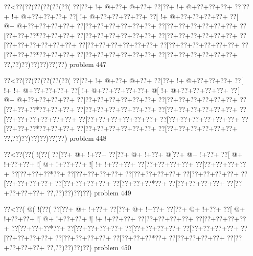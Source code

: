 \vbox{\vbox{\goo
\0??<\0??(\0??(\0??(\0??(\0??(\0??(
\0??[\0??+\- !+\- @+\0??+\- @+\0??+
\0??[\0??+\- !+\- @+\0??+\0??+\0??+
\0??[\0??+\- !+\- @+\0??+\0??+\0??+
\0??[\- !+\- @+\0??+\0??+\0??+\0??+
\0??[\- !+\- @+\0??+\0??+\0??+\0??+
\0??[\- @+\- @+\0??+\0??+\0??+\0??+
\0??[\0??+\0??+\0??+\0??+\0??+\0??+
\0??[\0??+\0??+\0??+\0??+\0??+\0??+
\0??[\0??+\0??+\0??*\0??+\0??+\0??+
\0??[\0??+\0??+\0??+\0??+\0??+\0??+
\0??[\0??+\0??+\0??+\0??+\0??+\0??+
\0??[\0??+\0??+\0??+\0??+\0??+\0??+
\0??[\0??+\0??+\0??+\0??+\0??+\0??+
\0??[\0??+\0??+\0??+\0??+\0??+\0??+
\0??[\0??+\0??+\0??*\0??+\0??+\0??+
\0??[\0??+\0??+\0??+\0??+\0??+\0??+
\0??[\0??+\0??+\0??+\0??+\0??+\0??+
\0??,\0??)\0??)\0??)\0??)\0??)\0??)
}
\hfil problem 447\hfil\break
}

\vbox{\vbox{\goo
\0??<\0??(\0??(\0??(\0??(\0??(\0??(
\0??[\0??+\- !+\- @+\0??+\- @+\0??+
\0??[\0??+\- !+\- @+\0??+\0??+\0??+
\0??[\- !+\- !+\- @+\0??+\0??+\0??+
\0??[\- !+\- @+\0??+\0??+\0??+\0??+
\- @[\- !+\- @+\0??+\0??+\0??+\0??+
\0??[\- @+\- @+\0??+\0??+\0??+\0??+
\0??[\0??+\0??+\0??+\0??+\0??+\0??+
\0??[\0??+\0??+\0??+\0??+\0??+\0??+
\0??[\0??+\0??+\0??*\0??+\0??+\0??+
\0??[\0??+\0??+\0??+\0??+\0??+\0??+
\0??[\0??+\0??+\0??+\0??+\0??+\0??+
\0??[\0??+\0??+\0??+\0??+\0??+\0??+
\0??[\0??+\0??+\0??+\0??+\0??+\0??+
\0??[\0??+\0??+\0??+\0??+\0??+\0??+
\0??[\0??+\0??+\0??*\0??+\0??+\0??+
\0??[\0??+\0??+\0??+\0??+\0??+\0??+
\0??[\0??+\0??+\0??+\0??+\0??+\0??+
\0??,\0??)\0??)\0??)\0??)\0??)\0??)
}
\hfil problem 448\hfil\break
}

\vbox{\vbox{\goo
\0??<\0??(\0??(\- !(\0??(
\0??[\0??+\- @+\- !+\0??+
\0??[\0??+\- @+\- !+\0??+
\- @[\0??+\- @+\- !+\0??+
\0??[\- @+\- !+\0??+\0??+
\- ![\- @+\- !+\0??+\0??+
\- ![\- !+\- !+\0??+\0??+
\0??[\0??+\0??+\0??+\0??+
\0??[\0??+\0??+\0??+\0??+
\0??[\0??+\0??+\0??*\0??+
\0??[\0??+\0??+\0??+\0??+
\0??[\0??+\0??+\0??+\0??+
\0??[\0??+\0??+\0??+\0??+
\0??[\0??+\0??+\0??+\0??+
\0??[\0??+\0??+\0??+\0??+
\0??[\0??+\0??+\0??*\0??+
\0??[\0??+\0??+\0??+\0??+
\0??[\0??+\0??+\0??+\0??+
\0??,\0??)\0??)\0??)\0??)
}
\hfil problem 449\hfil\break
}

\vbox{\vbox{\goo
\0??<\0??(\- @(\- !(\0??(
\0??[\0??+\- @+\- !+\0??+
\0??[\0??+\- @+\- !+\0??+
\0??[\0??+\- @+\- !+\0??+
\0??[\- @+\- !+\0??+\0??+
\- ![\- @+\- !+\0??+\0??+
\- ![\- !+\- !+\0??+\0??+
\0??[\0??+\0??+\0??+\0??+
\0??[\0??+\0??+\0??+\0??+
\0??[\0??+\0??+\0??*\0??+
\0??[\0??+\0??+\0??+\0??+
\0??[\0??+\0??+\0??+\0??+
\0??[\0??+\0??+\0??+\0??+
\0??[\0??+\0??+\0??+\0??+
\0??[\0??+\0??+\0??+\0??+
\0??[\0??+\0??+\0??*\0??+
\0??[\0??+\0??+\0??+\0??+
\0??[\0??+\0??+\0??+\0??+
\0??,\0??)\0??)\0??)\0??)
}
\hfil problem 450\hfil\break
}

